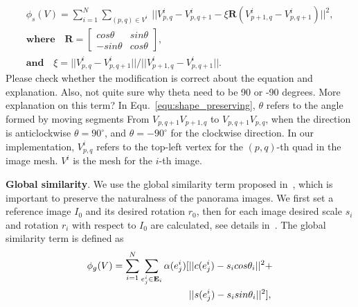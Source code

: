 \documentclass[10pt,journal,compsoc]{IEEEtran}
\newcommand{\zfl}[1]{{\color{red}#1}}
\begin{document}
\begin{equation} \label{equ:shape_preserving}
\begin{split}
    \phi_s(V) = \sum\limits_{i=1}^N\sum\limits_{(p,q)\in{V^i}} \
    ||V_{p,q}^i -V_{p,q+1}^i-\xi \mathbf{R}(V_{p+1,q}^i -V_{p,q+1}^i)||^2, \\
   \textbf{where}\quad \mathbf{R}=\left[\begin{array}{cc}cos\theta&sin\theta \\-sin\theta&cos\theta\end{array}\right], \\
    \textbf{and} \quad\xi=||V_{p,q}^i -V_{p,q+1}^i||/||V_{p+1,q}^i -V_{p,q+1}^i||.
\end{split}
\end{equation}
\zfl{Please check whether the modification is correct about the equation and explanation. Also, not quite sure why theta need to be 90 or -90 degrees. More explanation on this term?}
In Equ.~\ref{equ:shape_preserving}, $\theta$ refers to the angle formed by moving segments From $V_{p,q+1}V_{p+1,q}$ to $V_{p,q+1}V_{p,q}$, when the direction is anticlockwise $\theta=90^{\circ}$, and $\theta=-90^{\circ}$ for the clockwise direction. In our implementation, $V_{p,q}^i$ refers to the top-left vertex for the $(p,q)$-th quad in the image mesh. $V^i$ is the mesh for the $i$-th image.

\textbf{Global similarity}.
We use the global similarity term proposed in~\cite{conf/eccv/ChenC16}, which is important to preserve the naturalness of the panorama images.
We first set a reference image $I_0$ and its desired rotation $r_0$,  then for each image desired scale $s_i$ and rotation $r_i$ with respect to $I_0$ are calculated, see details in~\cite{conf/eccv/ChenC16}. The global similarity term is defined as
\begin{equation} \label{equ:global_similarity}
\begin{split}
\centering
    \phi_g(V) = \sum\limits_{i=1}^N\sum\limits_{e^i_j \in \mathbf{E}_i} \alpha(e^i_j)[&|| c(e^i_j)-s_i cos\theta_i ||^2+\\
    &|| s(e^i_j)-s_i sin\theta_i ||^2],
\end{split}
\end{equation}
\end{document}
